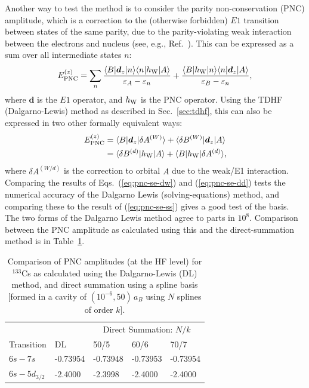 \documentclass[10pt,twocolumn,a4paper]{article}%
\newcommand{\bra}[1]{\ensuremath{\langle #1|}}	%
\newcommand{\ket}[1]{\ensuremath{|#1\rangle}}	%
\renewcommand{\v}[1]{\ensuremath{\boldsymbol{#1}}}		%
\newcommand{\be}{\begin{equation}}
\newcommand{\ee}{\end{equation}}
\def\en{\ensuremath{\varepsilon}}
\begin{document}


Another way to test the method is to consider the parity non-conservation (PNC) amplitude, which is a correction to the (otherwise forbidden) $E1$ transition between states of the same parity, due to the parity-violating weak interaction between the electrons and nucleus (see, e.g., Ref.~\cite{GingesRev2004}).
This can be expressed as a sum over all intermediate states $n$:
\be
E_{{\rm PNC}}^{(z)} = \sum_n\frac{\bra{B}\v{d}_z\ket{n}\bra{n}h_{\rm W}\ket{A}}{\en_{A}-\en_n} + \frac{\bra{B}h_{\rm W}\ket{n}\bra{n}\v{d}_z\ket{A}}{\en_{B}-\en_n},
\label{eq:pnc-se-ss}
\ee
where $\v{d}$ is the $E1$ operator, and $h_{\rm W}$ is the PNC operator.
Using the TDHF (Dalgarno-Lewis) method as described in Sec.~\ref{sec:tdhf}, this can also be expressed in two other formally equivalent ways:
\begin{align}
E_{{\rm PNC}}^{(z)} &= \bra{B}\v{d}_z\ket{\delta A^{(W)}} + \bra{\delta B^{(W)}}\v{d}_z\ket{A} \label{eq:pnc-se-dw}\\
&= \bra{\delta B^{(d)}}h_{\rm W}\ket{A} +  \bra{B}h_{\rm W}\ket{\delta A^{(d)}}\label{eq:pnc-se-dd},
\end{align}
where $\delta A^{(W/d)}$ is the correction to orbital $A$ due to the weak/E1 interaction.
%
Comparing the results of Eqs.~(\ref{eq:pnc-se-dw}) and (\ref{eq:pnc-se-dd}) tests the numerical accuracy of the Dalgarno Lewis (solving-equations) method, and comparing these to the result of (\ref{eq:pnc-se-ss}) gives a good test of the basis.
The two forms of the Dalgarno Lewis method agree to parts in $10^8$.
Comparison between the PNC amplitude as calculated using this and the direct-summation method is in Table~\ref{tab:pnc-basis}.



\begin{table}%
\small
\centering
\caption{\small
Comparison of PNC amplitudes (at the HF level) for $^{133}$Cs as calculated using the Dalgarno-Lewis (DL) method, and direct summation using a spline basis [formed in a cavity of $(10^{-6},50)\,a_B$ using $N$ splines  of order $k$].\label{tab:pnc-basis}}
\begin{tabular}{lllll}
\hline
\hline
&&\multicolumn{3}{c}{Direct Summation: $N/k$}\\
\cline{3-5}
Transition&DL&50/5&60/6&70/7\\
\hline
$6s-7s$&-0.73954&-0.73948&-0.73953&-0.73954\\
$6s-5d_{3/2}$&-2.4000&-2.3998&-2.4000&-2.4000\\
\hline
\hline
\end{tabular}
\end{table}
\end{document}
